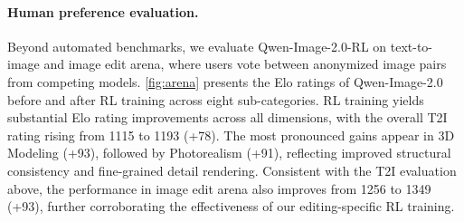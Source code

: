 \documentclass{article} %
\begin{document}
\paragraph{Human preference evaluation.}
Beyond automated benchmarks, we evaluate Qwen-Image-2.0-RL on text-to-image and image edit arena, where users vote between anonymized image pairs from competing models. \cref{fig:arena} presents the Elo ratings of Qwen-Image-2.0 before and after RL training across eight sub-categories. RL training yields substantial Elo rating improvements across all dimensions, with the overall T2I rating rising from 1115 to 1193 (+78). The most pronounced gains appear in 3D Modeling (+93), followed by Photorealism (+91), reflecting improved structural consistency and fine-grained detail rendering. Consistent with the T2I evaluation above, the performance in image edit arena also improves from 1256 to 1349 (+93), further corroborating the effectiveness of our editing-specific RL training.
\end{document}
